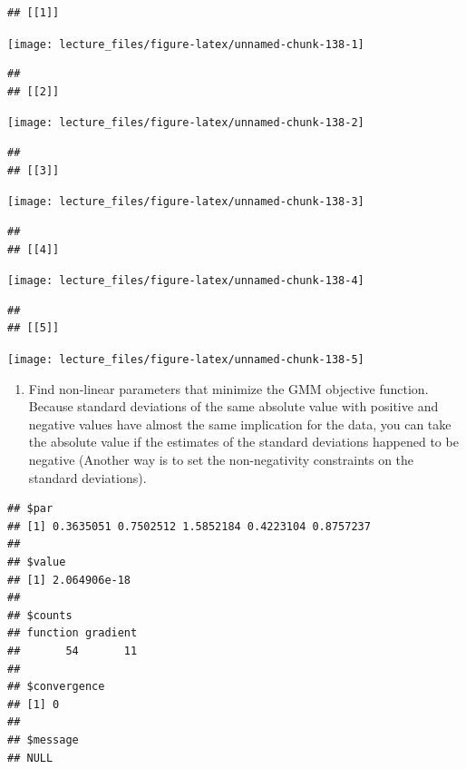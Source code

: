 \documentclass[
]{book}
\providecommand{\tightlist}{%
  \setlength{\itemsep}{0pt}\setlength{\parskip}{0pt}}
\begin{document}
\begin{verbatim}
## [[1]]
\end{verbatim}

\begin{center}\texttt{[image: lecture\_files/figure-latex/unnamed-chunk-138-1]} \end{center}

\begin{verbatim}
## 
## [[2]]
\end{verbatim}

\begin{center}\texttt{[image: lecture\_files/figure-latex/unnamed-chunk-138-2]} \end{center}

\begin{verbatim}
## 
## [[3]]
\end{verbatim}

\begin{center}\texttt{[image: lecture\_files/figure-latex/unnamed-chunk-138-3]} \end{center}

\begin{verbatim}
## 
## [[4]]
\end{verbatim}

\begin{center}\texttt{[image: lecture\_files/figure-latex/unnamed-chunk-138-4]} \end{center}

\begin{verbatim}
## 
## [[5]]
\end{verbatim}

\begin{center}\texttt{[image: lecture\_files/figure-latex/unnamed-chunk-138-5]} \end{center}

\begin{enumerate}
\def\labelenumi{\arabic{enumi}.}
\setcounter{enumi}{12}
\tightlist
\item
  Find non-linear parameters that minimize the GMM objective function. Because standard deviations of the same absolute value with positive and negative values have almost the same implication for the data, you can take the absolute value if the estimates of the standard deviations happened to be negative (Another way is to set the non-negativity constraints on the standard deviations).
\end{enumerate}

\begin{verbatim}
## $par
## [1] 0.3635051 0.7502512 1.5852184 0.4223104 0.8757237
## 
## $value
## [1] 2.064906e-18
## 
## $counts
## function gradient 
##       54       11 
## 
## $convergence
## [1] 0
## 
## $message
## NULL
\end{verbatim}
\end{document}
